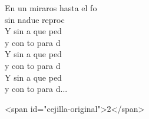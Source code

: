 \begin{cancion}
\begin{chorus}
		En un miraros hasta el fo \\
		sin nadue reproc \\
		Y sin a que ped \\
		y con to para d \\
		Y sin a que ped \\
		y con to para d \\
		Y sin a que ped \\
		y con to para d...\jump\\
	\end{chorus}%
<span id="cejilla-original">2</span>\\
\end{cancion}%
